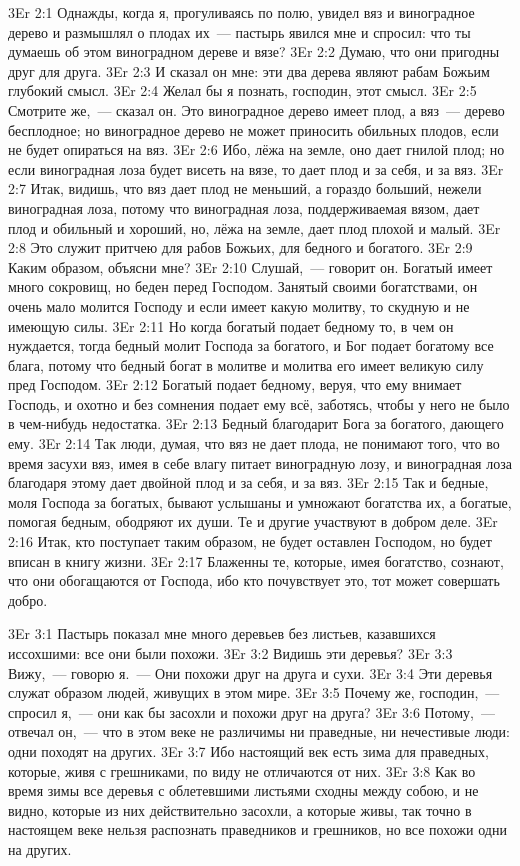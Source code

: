 \vs 3Er 2:1
Однажды, когда я, прогуливаясь по полю, увидел вяз и
виноградное дерево и размышлял о плодах их~--- пастырь явился мне и спросил: что
ты думаешь об этом виноградном дереве и вязе?
\vs 3Er 2:2
Думаю, что они пригодны
друг для друга.
\vs 3Er 2:3
И сказал он мне: эти два
дерева являют рабам Божьим глубокий смысл.
\vs 3Er 2:4
Желал бы я познать,
господин, этот смысл.
\vs 3Er 2:5
Смотрите же,~--- сказал он.
Это виноградное дерево имеет плод, а вяз~--- дерево бесплодное; но виноградное
дерево не может приносить обильных плодов, если не будет опираться на вяз.
\vs 3Er 2:6
Ибо, лёжа на земле, оно
дает гнилой плод; но если виноградная лоза будет висеть на вязе, то дает плод
и за себя, и за вяз.
\vs 3Er 2:7
Итак, видишь, что вяз дает
плод не меньший, а гораздо больший, нежели виноградная лоза, потому что
виноградная лоза, поддерживаемая вязом, дает плод и обильный и хороший, но,
лёжа на земле, дает плод плохой и малый.
\vs 3Er 2:8
Это служит притчею для
рабов Божьих, для бедного и богатого.
\vs 3Er 2:9
Каким образом, объясни
мне?
\vs 3Er 2:10
Слушай,~--- говорит он.
Богатый имеет много сокровищ, но беден перед Господом. Занятый своими
богатствами, он очень мало молится Господу и если имеет какую молитву, то
скудную и не имеющую силы.
\vs 3Er 2:11
Но когда богатый подает
бедному то, в чем он нуждается, тогда бедный молит Господа за богатого, и Бог
подает богатому все блага, потому что бедный богат в молитве и молитва его
имеет великую силу пред Господом.
\vs 3Er 2:12
Богатый подает бедному,
веруя, что ему внимает Господь, и охотно и без сомнения подает ему всё,
заботясь, чтобы у него не было в чем-нибудь недостатка.
\vs 3Er 2:13
Бедный благодарит Бога за
богатого, дающего ему.
\vs 3Er 2:14
Так люди, думая, что вяз
не дает плода, не понимают того, что во время засухи вяз, имея в себе влагу
питает виноградную лозу, и виноградная лоза благодаря этому дает двойной плод
и за себя, и за вяз.
\vs 3Er 2:15
Так и бедные, моля
Господа за богатых, бывают услышаны и умножают богатства их, а богатые,
помогая бедным, ободряют их души. Те и другие участвуют в добром деле.
\vs 3Er 2:16
Итак, кто поступает таким
образом, не будет оставлен Господом, но будет вписан в книгу жизни.
\vs 3Er 2:17
Блаженны те, которые,
имея богатство, сознают, что они обогащаются от Господа, ибо кто почувствует
это, тот может совершать добро.

\vs 3Er 3:1
Пастырь показал мне много деревьев без листьев, казавшихся
иссохшими: все они были похожи.
\vs 3Er 3:2
Видишь эти деревья?
\vs 3Er 3:3
Вижу,~--- говорю я.~--- Они
похожи друг на друга и сухи.
\vs 3Er 3:4
Эти деревья служат образом
людей, живущих в этом мире.
\vs 3Er 3:5
Почему же, господин,~--- спросил я,~--- они как бы засохли и похожи друг на друга?
\vs 3Er 3:6
Потому,~--- отвечал он,~--- что в этом веке не различимы
ни праведные, ни нечестивые люди: одни походят на других.
\vs 3Er 3:7
Ибо настоящий век есть
зима для праведных, которые, живя с грешниками, по виду не отличаются от них.
\vs 3Er 3:8
Как во время зимы все
деревья с облетевшими листьями сходны между собою, и не видно, которые из них
действительно засохли, а которые живы, так точно в настоящем веке нельзя
распознать праведников и грешников, но все похожи одни на других.

